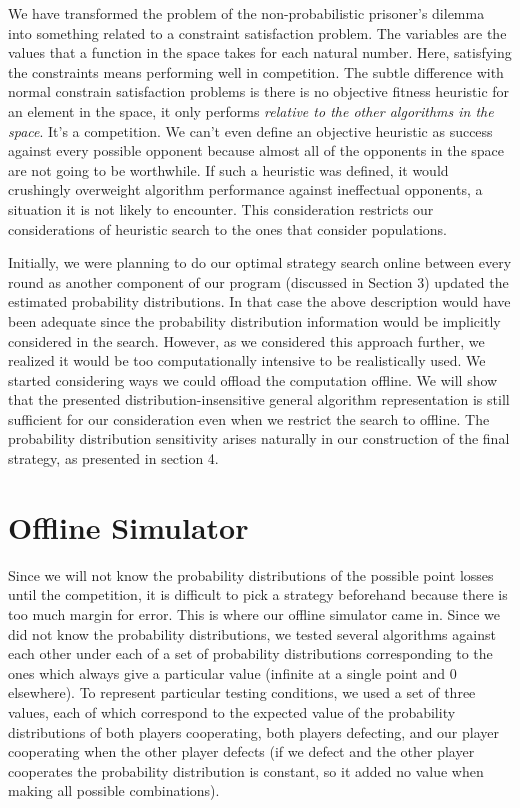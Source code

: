 \documentclass[11pt]{article}
\begin{document}
We have transformed the problem of the non-probabilistic prisoner's dilemma into something related to a constraint satisfaction problem. The variables are the values that a function in the space takes for each natural number. Here, satisfying the constraints means performing well in competition. The subtle difference with normal constrain satisfaction problems is there is no objective fitness heuristic for an element in the space, it only performs \emph{relative to the other algorithms in the space}. It's a competition. We can't even define an objective heuristic as success against every possible opponent because almost all of the opponents in the space are not going to be worthwhile. If such a heuristic was defined, it would crushingly overweight algorithm performance against ineffectual opponents, a situation it is not likely to encounter. This consideration restricts our considerations of heuristic search to the ones that consider populations. 


Initially, we were planning to do our optimal strategy search online between every round as another component of our program (discussed in Section 3) updated the estimated probability distributions. In that case the above description would have been adequate since the probability distribution information would be implicitly considered in the search. However, as we considered this approach further, we realized it would be too computationally intensive to be realistically used. We started considering ways we could offload the computation offline. We will show that the presented distribution-insensitive general algorithm representation is still sufficient for our consideration even when we restrict the search to offline. The probability distribution sensitivity arises naturally in our construction of the final strategy, as presented in section 4.

\section{Offline Simulator}

Since we will not know the probability distributions of the possible point losses until the competition, it is difficult to pick a strategy beforehand because there is too much margin for error. This is where our offline simulator came in. Since we did not know the probability distributions, we tested several algorithms against each other under each of a set of probability distributions corresponding to the ones which always give a particular value (infinite at a single point and 0 elsewhere). To represent particular testing conditions, we used a set of three values, each of which correspond to the expected value of the probability distributions of both players cooperating, both players defecting, and our player cooperating when the other player defects (if we defect and the other player cooperates the probability distribution is constant, so it added no value when making all possible combinations). 
 
\end{document}
